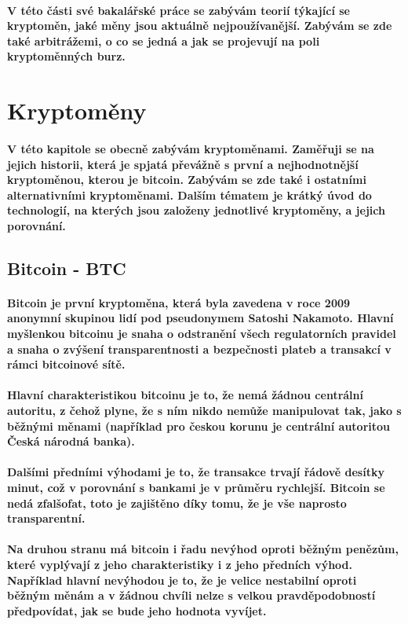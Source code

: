 \documentclass[thesis=B,czech]{FITthesis}[2019/03/21]
\begin{document}
\paragraph{
V této části své bakalářské práce se zabývám teorií týkající se kryptoměn, jaké měny jsou aktuálně nejpoužívanější. Zabývám se zde také arbitrážemi, o co se jedná a jak se projevují na poli kryptoměnných burz.
}
\section{Kryptoměny}
\paragraph{
V této kapitole se obecně zabývám kryptoměnami. Zaměřuji se na jejich historii, která je spjatá převážně s první a nejhodnotnější kryptoměnou, kterou je bitcoin. Zabývám se zde také i ostatními alternativními kryptoměnami. 
Dalším tématem je krátký úvod do technologií, na kterých jsou založeny jednotlivé kryptoměny, a jejich porovnání. \cite{BudoucnostFinTrhu}
}
\subsection{Bitcoin - BTC}
\paragraph{
Bitcoin je první kryptoměna, která byla zavedena v roce 2009 anonymní skupinou lidí pod pseudonymem Satoshi Nakamoto. Hlavní myšlenkou bitcoinu je snaha o odstranění všech regulatorních pravidel a snaha o zvýšení transparentnosti a bezpečnosti plateb a transakcí v rámci bitcoinové sítě. \cite{Finex}
}
\paragraph{
Hlavní charakteristikou bitcoinu je to, že nemá žádnou centrální autoritu, z čehož plyne, že s ním nikdo nemůže manipulovat tak, jako s běžnými měnami (například pro českou korunu je centrální autoritou Česká národná banka).
}
\paragraph{
Dalšími předními výhodami je to, že transakce trvají řádově desítky minut, což v porovnání s bankami je v průměru rychlejší. Bitcoin se nedá zfalšofat, toto je zajištěno díky tomu, že je vše naprosto transparentní. 
}
\paragraph{
Na druhou stranu má bitcoin i řadu nevýhod oproti běžným penězům, které vyplývají z jeho charakteristiky i z jeho předních výhod. Například hlavní nevýhodou je to, že je velice nestabilní oproti běžným měnám a v žádnou chvíli nelze s velkou pravděpodobností předpovídat, jak se bude jeho hodnota vyvíjet. 
}
\end{document}
